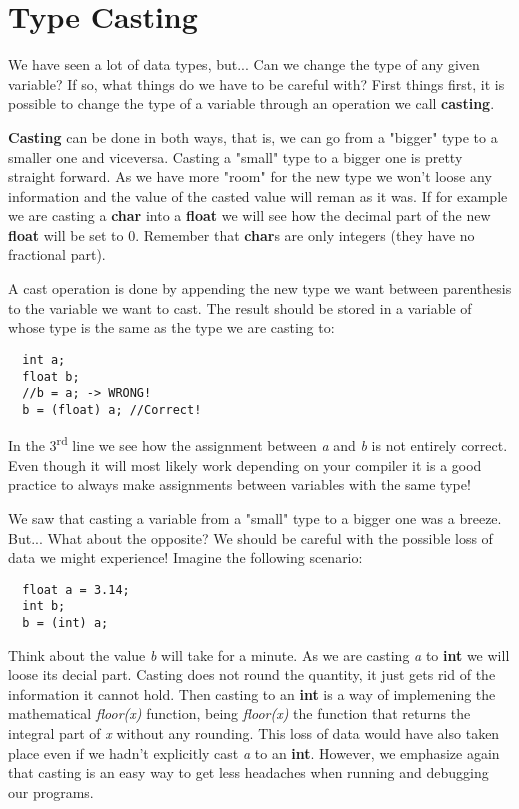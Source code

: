 \documentclass[12pt]{book}
\begin{document}
\section{Type Casting}

We have seen a lot of data types, but... Can we change the type of any given variable? If so, what things do we have to be careful with? First things first, it is possible to change the type of a variable through an operation we call \textbf{casting}.

\textbf{Casting} can be done in both ways, that is, we can go from a "bigger" type to a smaller one and viceversa. Casting a "small" type to a bigger one is pretty straight forward. As we have more "room" for the new type we won't loose any information and the value of the casted value will reman as it was. If for example we are casting a \textbf{char} into a \textbf{float} we will see how the decimal part of the new \textbf{float} will be set to 0. Remember that \textbf{char}s are only integers (they have no fractional part).

A cast operation is done by appending the new type we want between parenthesis to the variable we want to cast. The result should be stored in a variable of whose type is the same as the type we are casting to:

\begin{verbatim}
  int a;
  float b;
  //b = a; -> WRONG!
  b = (float) a; //Correct!
\end{verbatim}

In the 3\textsuperscript{rd} line we see how the assignment between \textit{a} and \textit{b} is not entirely correct. Even though it will most likely work depending on your compiler it is a good practice to always make assignments between variables with the same type!

We saw that casting a variable from a "small" type to a bigger one was a breeze. But... What about the opposite? We should be careful with the possible loss of data we might experience! Imagine the following scenario:

\begin{verbatim}
  float a = 3.14;
  int b;
  b = (int) a;
\end{verbatim}

Think about the value \textit{b} will take for a minute. As we are casting \textit{a} to \textbf{int} we will loose its decial part. Casting does not round the quantity, it just gets rid of the information it cannot hold. Then casting to an \textbf{int} is a way of implemening the mathematical \textit{floor(x)} function, being \textit{floor(x)} the function that returns the integral part of \textit{x} without any rounding. This loss of data would have also taken place even if we hadn't explicitly cast \textit{a} to an \textbf{int}. However, we emphasize again that casting is an easy way to get less headaches when running and debugging our programs.
\end{document}
